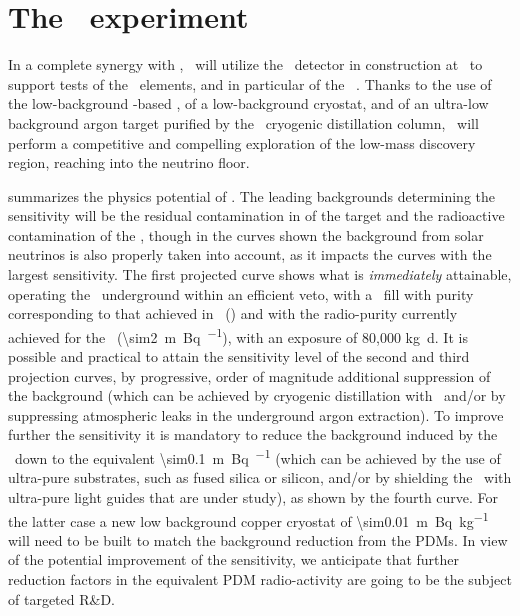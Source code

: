 \section{The  \DSl\ experiment}
\label{sec:DSl}

In a complete synergy with \DSks, \DSls\ will utilize the \DSp\ detector in construction at \CERN\ to support tests of the \DSks\ elements, and in particular of the \DSkPdms~\cite{DIncecco:2018fx,DIncecco:2018hy}.  Thanks to the use of the low-background \SiPM-based \DSkPdms, of a low-background cryostat, and of an ultra-low background argon target purified by the \Aria\ cryogenic distillation column, \DSls\ will perform a competitive and compelling exploration of the low-mass discovery region, reaching into the neutrino floor.

 summarizes the physics potential of \DSls.  The leading backgrounds determining the sensitivity will be the residual contamination in  of the target and the radioactive contamination of the \DSkPdms, though in the curves shown the background from solar neutrinos is also properly taken into account, as it impacts the curves with the largest sensitivity. The first projected curve shows 
  what is {\em immediately} attainable, 
  operating the \DSp\ underground 
  within an efficient veto, 
  with a \UAr\ fill with purity corresponding to that achieved in \DSf\ (\DSfUArArThreeNineActivity) and with the radio-purity currently achieved for the \DSkPdms\ (\SI{\sim2}{m\becquerel\per\pdm}), with an exposure of 80,000  \si{\kg d}.
 It is possible and practical to attain the sensitivity level of the second and third projection curves, 
 by progressive, order of magnitude additional suppression of the  background (which can be achieved by cryogenic distillation with \Aria\ and/or by suppressing atmospheric leaks in the underground argon extraction). To improve further the sensitivity it is mandatory to reduce the 
  background induced by the \DSkPdms\ down to the equivalent  \SI{\sim0.1}{m\becquerel\per\pdm}
(which can be achieved by the use of ultra-pure substrates, such as fused silica or silicon, and/or by shielding the \DSkPdms\ with ultra-pure light guides that are under study), as shown by the fourth curve. For the latter case a new low background copper cryostat of   \SI{\sim0.01}{m\becquerel\per\kg} will need to be built to match the background reduction from the PDMs. In view of the potential improvement of the  sensitivity, we anticipate that   further reduction factors in the equivalent PDM radio-activity are going to be the subject of targeted R\&D. 

